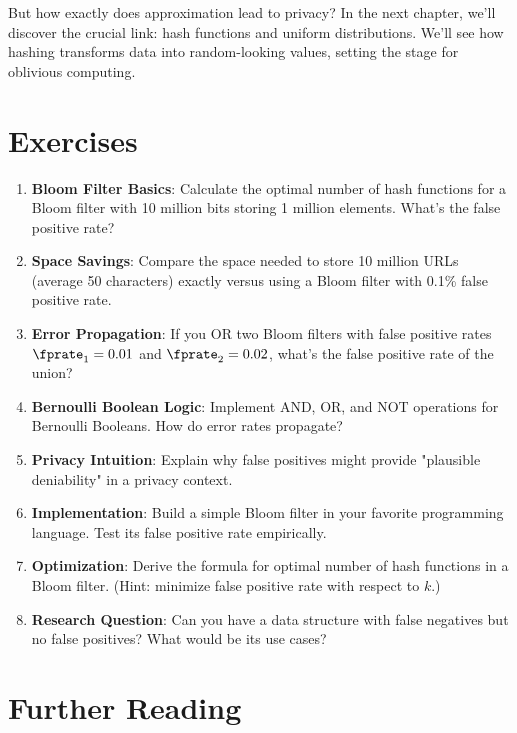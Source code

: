 But how exactly does approximation lead to privacy? In the next chapter, we'll discover the crucial link: hash functions and uniform distributions. We'll see how hashing transforms data into random-looking values, setting the stage for oblivious computing.

\section{Exercises}

\begin{enumerate}
    \item \textbf{Bloom Filter Basics}: Calculate the optimal number of hash functions for a Bloom filter with 10 million bits storing 1 million elements. What's the false positive rate?
    
    \item \textbf{Space Savings}: Compare the space needed to store 10 million URLs (average 50 characters) exactly versus using a Bloom filter with 0.1\% false positive rate.
    
    \item \textbf{Error Propagation}: If you OR two Bloom filters with false positive rates $\fprate_1 = 0.01$ and $\fprate_2 = 0.02$, what's the false positive rate of the union?
    
    \item \textbf{Bernoulli Boolean Logic}: Implement AND, OR, and NOT operations for Bernoulli Booleans. How do error rates propagate?
    
    \item \textbf{Privacy Intuition}: Explain why false positives might provide "plausible deniability" in a privacy context.
    
    \item \textbf{Implementation}: Build a simple Bloom filter in your favorite programming language. Test its false positive rate empirically.
    
    \item \textbf{Optimization}: Derive the formula for optimal number of hash functions in a Bloom filter. (Hint: minimize false positive rate with respect to $k$.)
    
    \item \textbf{Research Question}: Can you have a data structure with false negatives but no false positives? What would be its use cases?
\end{enumerate}

\section{Further Reading}

